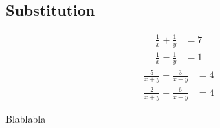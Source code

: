 \documentclass[11pt,oneside]{article}
\begin{document}
\subsection*{Substitution}
\begin{align*}
	\frac{1}{x}+\frac{1}{y}&=7\\
	\frac{1}{x}-\frac{1}{y}&=1
\end{align*}\vspace{3cm}
\begin{align*}
	\frac{5}{x+y}-\frac{3}{x-y}&=4\\
	\frac{2}{x+y}+\frac{6}{x-y}&=4
\end{align*}\vspace{5cm}
\begin{aufgabe}
	Blablabla
	\vspace{2cm}
\end{aufgabe}
\newpage
\end{document}
